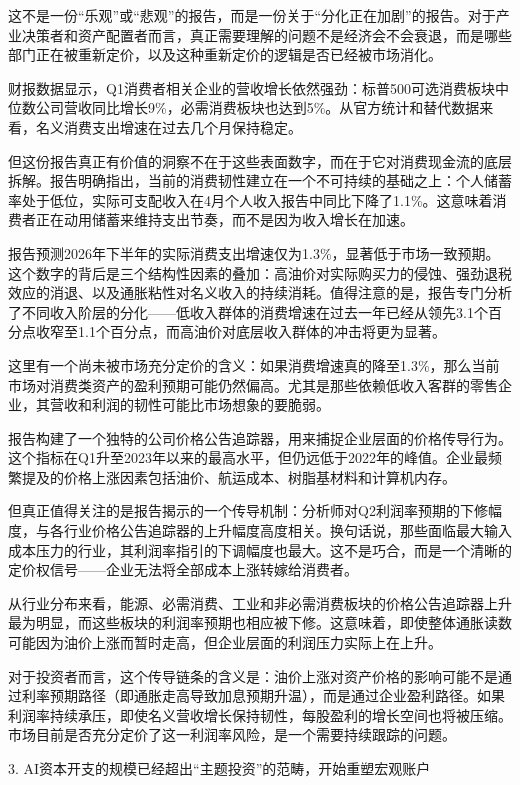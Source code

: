 \documentclass[11pt]{ctexart}
\begin{document}
这不是一份“乐观”或“悲观”的报告，而是一份关于“分化正在加剧”的报告。对于产业决策者和资产配置者而言，真正需要理解的问题不是经济会不会衰退，而是哪些部门正在被重新定价，以及这种重新定价的逻辑是否已经被市场消化。

财报数据显示，Q1消费者相关企业的营收增长依然强劲：标普500可选消费板块中位数公司营收同比增长9\%，必需消费板块也达到5\%。从官方统计和替代数据来看，名义消费支出增速在过去几个月保持稳定。

但这份报告真正有价值的洞察不在于这些表面数字，而在于它对消费现金流的底层拆解。报告明确指出，当前的消费韧性建立在一个不可持续的基础之上：个人储蓄率处于低位，实际可支配收入在4月个人收入报告中同比下降了1.1\%。这意味着消费者正在动用储蓄来维持支出节奏，而不是因为收入增长在加速。

报告预测2026年下半年的实际消费支出增速仅为1.3\%，显著低于市场一致预期。这个数字的背后是三个结构性因素的叠加：高油价对实际购买力的侵蚀、强劲退税效应的消退、以及通胀粘性对名义收入的持续消耗。值得注意的是，报告专门分析了不同收入阶层的分化——低收入群体的消费增速在过去一年已经从领先3.1个百分点收窄至1.1个百分点，而高油价对底层收入群体的冲击将更为显著。

这里有一个尚未被市场充分定价的含义：如果消费增速真的降至1.3\%，那么当前市场对消费类资产的盈利预期可能仍然偏高。尤其是那些依赖低收入客群的零售企业，其营收和利润的韧性可能比市场想象的要脆弱。

报告构建了一个独特的公司价格公告追踪器，用来捕捉企业层面的价格传导行为。这个指标在Q1升至2023年以来的最高水平，但仍远低于2022年的峰值。企业最频繁提及的价格上涨因素包括油价、航运成本、树脂基材料和计算机内存。

但真正值得关注的是报告揭示的一个传导机制：分析师对Q2利润率预期的下修幅度，与各行业价格公告追踪器的上升幅度高度相关。换句话说，那些面临最大输入成本压力的行业，其利润率指引的下调幅度也最大。这不是巧合，而是一个清晰的定价权信号——企业无法将全部成本上涨转嫁给消费者。

从行业分布来看，能源、必需消费、工业和非必需消费板块的价格公告追踪器上升最为明显，而这些板块的利润率预期也相应被下修。这意味着，即使整体通胀读数可能因为油价上涨而暂时走高，但企业层面的利润压力实际上在上升。

对于投资者而言，这个传导链条的含义是：油价上涨对资产价格的影响可能不是通过利率预期路径（即通胀走高导致加息预期升温），而是通过企业盈利路径。如果利润率持续承压，即使名义营收增长保持韧性，每股盈利的增长空间也将被压缩。市场目前是否充分定价了这一利润率风险，是一个需要持续跟踪的问题。

3. AI资本开支的规模已经超出“主题投资”的范畴，开始重塑宏观账户
\end{document}
